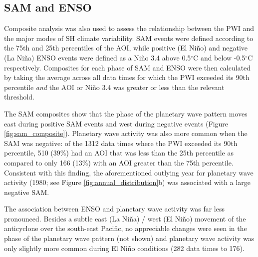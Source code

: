   
\subsection{SAM and ENSO}

Composite analysis was also used to assess the relationship between the PWI and the major modes of SH climate variability. SAM events were defined according to the 75th and 25th percentiles of the AOI, while positive (El Ni\~{n}o) and negative (La Ni\~{n}a) ENSO events were defined as a Ni\~{n}o 3.4 above 0.5$^{\circ}$C and below -0.5$^{\circ}$C respectively. Composites for each phase of SAM and ENSO were then calculated by taking the average across all data times for which the PWI exceeded its 90th percentile \textit{and} the AOI or Ni\~{n}o 3.4 was greater or less than the relevant threshold. 

The SAM composites show that the phase of the planetary wave pattern moves east during positive SAM events and west during negative events (Figure \ref{fig:sam_composite}). Planetary wave activity was also more common when the SAM was negative: of the 1312 data times where the PWI exceeded its 90th percentile, 510 (39\%) had an AOI that was less than the 25th percentile as compared to only 166 (13\%) with an AOI greater than the 75th percentile. Consistent with this finding, the aforementioned outlying year for planetary wave activity (1980; see Figure \ref{fig:annual_distribution}b) was associated with a large negative SAM.

The association between ENSO and planetary wave activity was far less pronounced. Besides a subtle east (La Ni\~{n}a) / west (El Ni\~{n}o) movement of the anticyclone over the south-east Pacific, no appreciable changes were seen in the phase of the planetary wave pattern (not shown) and planetary wave activity was only slightly more common during El Ni\~{n}o conditions (282 data times to 176).      

